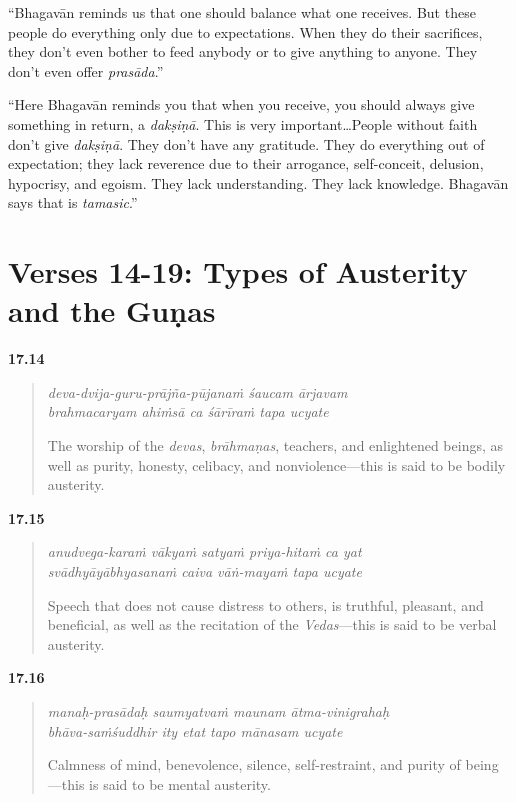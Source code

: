 \enquote{Bhagavān reminds us that one should balance what one receives. But these people do everything only due to expectations. When they do their sacrifices, they don’t even bother to feed anybody or to give anything to anyone. They don’t even offer \textit{prasāda}.}

\enquote{Here Bhagavān reminds you that when you receive, you should always give something in return, a \textit{dakṣiṇā}. This is very important\ldots People without faith don’t give \textit{dakṣiṇā}. They don’t have any gratitude. They do everything out of expectation; they lack reverence due to their arrogance, self-conceit, delusion, hypocrisy, and egoism. They lack understanding. They lack knowledge. Bhagavān says that is \textit{tamasic}.}

\section{Verses 14-19: Types of Austerity and the Guṇas}\label{sec-verses-14-19-types-of-austerity-and-the-gunas}


\par\noindent\textbf{17.14}\par
\begin{verse}
\textit{deva-dvija-guru-prājña-pūjanaṁ śaucam ārjavam} \\
\textit{brahmacaryam ahiṁsā ca śārīraṁ tapa ucyate}

\noindent The worship of the \textit{devas}, \textit{brāhmaṇas}, teachers, and enlightened beings, as well as purity, honesty, celibacy, and nonviolence---this is said to be bodily austerity.
\end{verse}
\par



\par\noindent\textbf{17.15}\par
\begin{verse}
\textit{anudvega-karaṁ vākyaṁ satyaṁ priya-hitaṁ ca yat} \\
\textit{svādhyāyābhyasanaṁ caiva vāṅ-mayaṁ tapa ucyate}

\noindent Speech that does not cause distress to others, is truthful, pleasant, and beneficial, as well as the recitation of the \textit{Vedas}---this is said to be verbal austerity.
\end{verse}
\par



\par\noindent\textbf{17.16}\par
\begin{verse}
\textit{manaḥ-prasādaḥ saumyatvaṁ maunam ātma-vinigrahaḥ} \\
\textit{bhāva-saṁśuddhir ity etat tapo mānasam ucyate}

\noindent Calmness of mind, benevolence, silence, self-restraint, and purity of being---this is said to be mental austerity.
\end{verse}
\par



